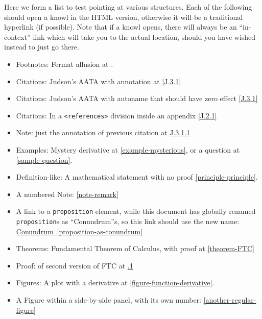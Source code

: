 \documentclass{amsart}
\theoremstyle{plain}%
\theoremstyle{definition}%
\theoremstyle{remark}%
\newcommand{\xreffont}{\relax}
\newcommand{\mono}[1]{\texttt{#1}}
\numberwithin{equation}{section}
\begin{document}
Here we form a list to test pointing at various structures.  Each of the following should open a knowl in the HTML version, otherwise it will be a traditional hyperlink (if possible).  Note that if a knowl opens, there will always be an ``in-context'' link which will take you to the actual location, should you have  wished instead to just go there.%
\begin{itemize}[label=\textbullet]
\item{}Footnotes: Fermat allusion at \hyperref[footnote-fermat]{{\xreffont 2.1}}.%
\item{}Citations: Judson's AATA with annotation at \hyperlink{biblio-judson-AATA}{[{\xreffont J.3.1}]}%
\item{}Citations: Judson's AATA with autoname that should have zero effect \hyperlink{biblio-judson-AATA}{[{\xreffont J.3.1}]}%
\item{}Citations: In a \mono{<references>} division inside an appendix \hyperlink{biblio-strang-article-uno}{[{\xreffont J.2.1}]}%
\item{}Note: just the annotation of previous citation at \hyperlink{note-judson-AATA}{{\xreffont J.3.1.1}}%
\item{}Examples: Mystery derivative at \hyperref[example-mysterious]{{\xreffont\ref{example-mysterious}}}, or a question at \hyperref[sample-question]{{\xreffont\ref{sample-question}}}.%
\item{}Definition-like: A mathematical statement with no proof \hyperref[principle-principle]{{\xreffont\ref{principle-principle}}}.%
\item{}A numbered Note: \hyperref[note-remark]{{\xreffont\ref{note-remark}}}%
\item{}A link to a \mono{proposition} element, while this document has globally renamed \mono{proposition}s as ``Conundrum''s, so this link should use the new name: \hyperref[proposition-as-conundrum]{Conundrum~{\xreffont\ref{proposition-as-conundrum}}}%
\item{}Theorems: Fundamental Theorem of Calculus, with proof at \hyperref[theorem-FTC]{{\xreffont\ref{theorem-FTC}}}%
\item{}Proof: of second version of FTC at \hyperlink{proof-FTC-corollary}{{\xreffont 4.1.1}}%
\item{}Figures: A plot with a derivative at \hyperref[figure-function-derivative]{{\xreffont\ref{figure-function-derivative}}}.%
\item{}A Figure within a side-by-side panel, with its own number: \hyperref[another-regular-figure]{{\xreffont\ref{another-regular-figure}}}%

\end{itemize}
\end{document}
